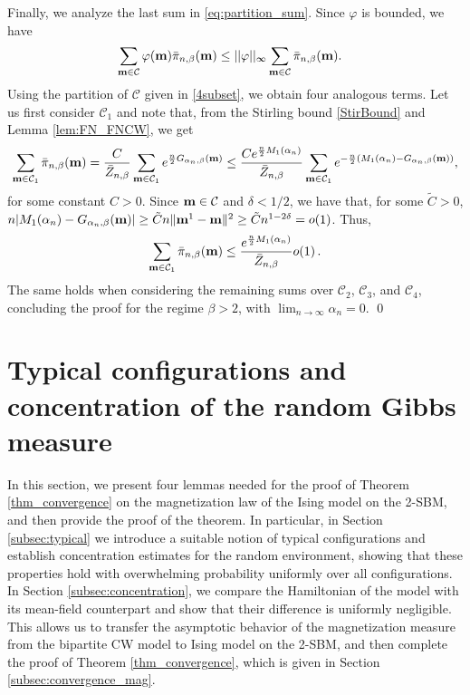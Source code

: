 \documentclass[11pt,oneside]{amsart}
\numberwithin{equation}{section}  %
\theoremstyle{plain}
\theoremstyle{remark}
\def \bm {{\bf m}}
\begin{document}
Finally, we analyze the last sum in \eqref{eq:partition_sum}. Since $\varphi$ is bounded, we have
\begin{align*}
    &\sum_{\bm \in \mathcal{C}} \varphi(\bm) \bar{\pi}_{n,\beta}(\bm) \leq ||\varphi||_{\infty}\sum_{\bm \in \mathcal{C}} \bar{\pi}_{n,\beta}(\bm).
    \end{align*}
Using the partition of $\mathcal{C}$ given in \eqref{4subset}, 
we obtain four analogous terms. Let us first consider $\mathcal{C}_1$ and note that, from the Stirling bound \eqref{StirBound} and Lemma \ref{lem:FN_FNCW}, we get
\begin{align*}
    \sum_{ \bm \in \mathcal{C}_1} \bar{\pi}_{n,\beta}(\bm) 
    =\frac{C}{\bar{Z}_{n,\beta}}\sum_{\substack{\bm \in \mathcal{C}_1}}
   e^{ \frac{n}{2} G_{\alpha_n,\beta}(\bm)}
        \leq
    \frac{Ce^{\frac{n}{2} M_1(\alpha_n)}}{\bar{Z}_{n,\beta}}\sum_{\bm \in \mathcal{C}_1}e^{ -\frac{n}{2} (M_1(\alpha_n)-G_{\alpha_n,\beta}(\bm))},
\end{align*}
for some constant $C>0$. Since $\bm \in \mathcal{C}$ and $\delta <1/2$, we have that,
for some $\tilde C>0$,
$n|M_1(\alpha_n)-G_{\alpha_n,\beta}(\bm)| \geq \tilde C n\|\bm^1-\bm\|^2 \geq \tilde C n^{1-2\delta}=o(1)$. Thus,
\begin{align*}
    \sum_{\bm \in \mathcal{C}_1} \bar{\pi}_{n,\beta}(\bm) \leq\frac{e^{\frac{n}{2} M_1(\alpha_n)}}{\bar{Z}_{n,\beta}} o(1)\,.
\end{align*}
The same holds when considering the remaining sums over $\mathcal{C}_2$, $\mathcal{C}_3$, and $\mathcal{C}_4$, concluding  
the proof for the regime $\beta>2$, with $\lim_{n\to\infty}\alpha_n=0$.
\qed


\section{Typical configurations and concentration of the random Gibbs measure}\label{sec:concentration}

In this section, we present four lemmas needed for the proof of Theorem \ref{thm_convergence} on the magnetization law of the Ising model on the 2-SBM, and then provide the proof of the theorem. In particular, in Section \ref{subsec:typical} we introduce a suitable notion of typical configurations and establish concentration estimates for the random environment, showing that these properties hold with overwhelming probability uniformly over all configurations. In Section \ref{subsec:concentration}, we compare the Hamiltonian of the model with its mean-field counterpart and show that their difference is uniformly negligible. This allows us to transfer the asymptotic behavior of the magnetization measure 
from the bipartite CW model to Ising model on the 2-SBM, and then complete the proof of Theorem \ref{thm_convergence}, 
which is given in Section \ref{subsec:convergence_mag}.
\end{document}
